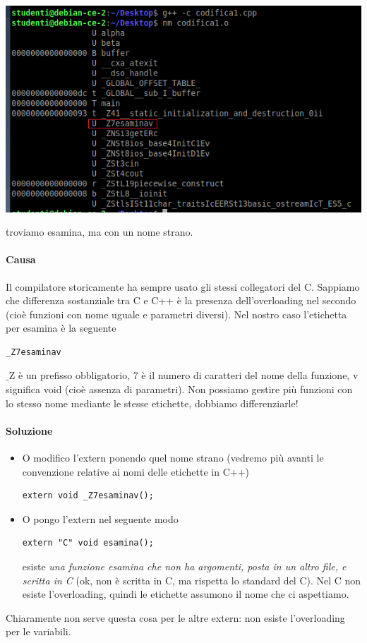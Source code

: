 \documentclass[11pt]{report}
\theoremstyle{definition}
\begin{document}
\begin{center}
	\includegraphics{img/152.PNG}
\end{center} 
troviamo esamina, ma con un nome strano.
\paragraph{Causa} Il compilatore storicamente ha sempre usato gli stessi collegatori del C. Sappiamo che differenza sostanziale tra C e C++ è la presenza dell'overloading nel secondo (cioè funzioni con nome uguale e parametri diversi). Nel nostro caso l'etichetta per esamina è la seguente
\begin{verbatim}
_Z7esaminav
\end{verbatim}
$\_$Z è un prefisso obbligatorio, 7 è il numero di caratteri del nome della funzione, v significa void (cioè assenza di parametri). Non possiamo gestire più funzioni con lo stesso nome mediante le stesse etichette, dobbiamo differenziarle! 
\paragraph{Soluzione}
\begin{itemize}
\item O modifico l'extern ponendo quel nome strano (vedremo più avanti le convenzione relative ai nomi delle etichette in C++)
\begin{verbatim}
extern void _Z7esaminav();
\end{verbatim}
\item O pongo l'extern nel seguente modo
\begin{verbatim}
extern "C" void esamina();
\end{verbatim}
esiste \emph{una funzione esamina che non ha argomenti, posta in un altro file, e scritta in C} (ok, non è scritta in C, ma rispetta lo standard del C). Nel C non esiste l'overloading, quindi le etichette assumono il nome che ci aspettiamo.
\end{itemize}
Chiaramente non serve questa cosa per le altre extern: non esiste l'overloading per le variabili.
\end{document}
